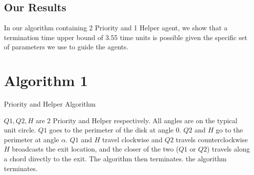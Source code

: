 \documentclass[11pt]{amsart}
\begin{document}
\subsection{Our Results}

In our algorithm containing 2 Priority and 1 Helper agent, we show that a termination time
upper bound of 3.55 time units is possible given the specific set of parameters we use
to guide the agents.




\section{Algorithm 1}


\begin{algorithm}
  \caption{Priority and Helper Algorithm}
  \begin{algorithmic}[1]
      \State $Q1, Q2, H$ are 2 Priority and Helper respectively.
      \State All angles are on the typical unit circle.
      \State $Q1$ goes to the perimeter of the disk at angle 0.
      \State $Q2$ and $H$ go to the perimeter at angle $\alpha$.
      \Repeat $Q1$ and $H$ travel clockwise and $Q2$ travels counterclockwise 
       $H$ broadcasts the exit location, and the closer of the
      two ($Q1$ or $Q2$) travels along a chord directly to the exit. The algorithm then terminates. \EndIf
       the algorithm terminates. \EndIf
    \EndProcedure
  \end{algorithmic}
\end{algorithm}
\end{document}
